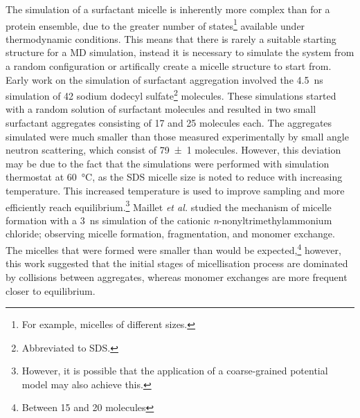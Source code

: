 The simulation of a surfactant micelle is inherently more complex than for a protein ensemble, due to the greater number of states\footnote{For example, micelles of different sizes.} available under thermodynamic conditions.
This means that there is rarely a suitable starting structure for a MD simulation, instead it is necessary to simulate the system from a random configuration or artifically create a micelle structure to start from.
Early work on the simulation of surfactant aggregation involved the \SI{4.5}{\nano\second} simulation of 42 sodium dodecyl sulfate\footnote{Abbreviated to SDS.} molecules.\autocite{tarek_molecular_1998}
These simulations started with a random solution of surfactant molecules and resulted in two small surfactant aggregates consisting of 17 and 25 molecules each.
The aggregates simulated were much smaller than those measured experimentally by small angle neutron scattering, which consist of \num{79\pm1} molecules.\autocite{hassan_small_2003}
However, this deviation may be due to the fact that the simulations were performed with simulation thermostat at \SI{60}{\celsius}, as the SDS micelle size is noted to reduce with increasing temperature.\autocite{hayashi_micelle_1980}
This increased temperature is used to improve sampling and more efficiently reach equilibrium.\footnote{However, it is possible that the application of a coarse-grained potential model may also achieve this.}
Maillet \emph{et al.} studied the mechanism of micelle formation with a \SI{3}{\nano\second} simulation of the cationic \emph{n}-nonyltrimethylammonium chloride; observing micelle formation, fragmentation, and monomer exchange.\autocite{maillet_large_1999}
The micelles that were formed were smaller than would be expected,\footnote{Between 15 and 20 molecules} however, this work suggested that the initial stages of micellisation process are dominated by collisions between aggregates, whereas monomer exchanges are more frequent closer to equilibrium.

